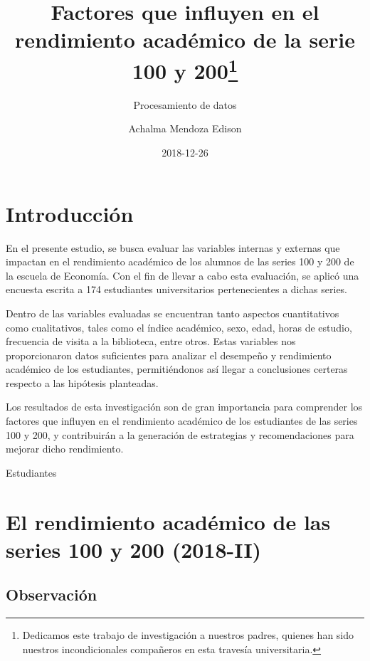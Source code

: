 \documentclass[
  letterpaper,
  DIV=11,
  numbers=noendperiod]{scrartcl}
\title{Factores que influyen en el rendimiento académico de la serie 100
y 200\thanks{Dedicamos este trabajo de investigación a nuestros padres,
quienes han sido nuestros incondicionales compañeros en esta travesía
universitaria.}}
\subtitle{Procesamiento de datos}
\author{Achalma Mendoza Edison}
\date{2018-12-26}
\begin{document}
\maketitle
\ifdefined\Shaded\renewenvironment{Shaded}{\begin{tcolorbox}[interior hidden, boxrule=0pt, frame hidden, borderline west={3pt}{0pt}{shadecolor}, sharp corners, enhanced, breakable]}{\end{tcolorbox}}\fi

\hypertarget{introducciuxf3n}{%
\section{Introducción}\label{introducciuxf3n}}

En el presente estudio, se busca evaluar las variables internas y
externas que impactan en el rendimiento académico de los alumnos de las
series 100 y 200 de la escuela de Economía. Con el fin de llevar a cabo
esta evaluación, se aplicó una encuesta escrita a 174 estudiantes
universitarios pertenecientes a dichas series.

Dentro de las variables evaluadas se encuentran tanto aspectos
cuantitativos como cualitativos, tales como el índice académico, sexo,
edad, horas de estudio, frecuencia de visita a la biblioteca, entre
otros. Estas variables nos proporcionaron datos suficientes para
analizar el desempeño y rendimiento académico de los estudiantes,
permitiéndonos así llegar a conclusiones certeras respecto a las
hipótesis planteadas.

Los resultados de esta investigación son de gran importancia para
comprender los factores que influyen en el rendimiento académico de los
estudiantes de las series 100 y 200, y contribuirán a la generación de
estrategias y recomendaciones para mejorar dicho rendimiento.

Estudiantes

\hypertarget{el-rendimiento-acaduxe9mico-de-las-series-100-y-200-2018-ii}{%
\section{El rendimiento académico de las series 100 y 200
(2018-II)}\label{el-rendimiento-acaduxe9mico-de-las-series-100-y-200-2018-ii}}

\hypertarget{observaciuxf3n}{%
\subsection{Observación}\label{observaciuxf3n}}
\end{document}
